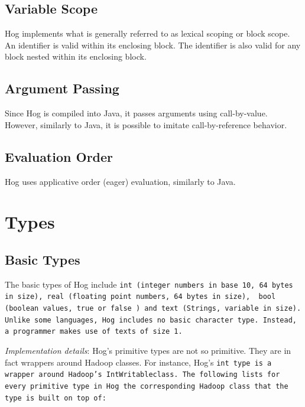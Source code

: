 \documentclass{book}
\begin{document}

\subsection{Variable Scope} %
\label{sub:variable_scope}

Hog implements what is generally referred to as lexical scoping or block scope. An
identifier is valid within its enclosing block. The identifier is also valid for
any block nested within its enclosing block.



\subsection{Argument Passing}
\label{sub:argument_passing}

Since Hog is compiled into Java, it passes arguments using call-by-value.
However, similarly to Java, it is possible to imitate call-by-reference
behavior. 

\subsection{Evaluation Order}
\label{sub:evaluation_order}

Hog uses applicative order (eager) evaluation, similarly to Java.



\section{Types} %
\label{sec:types}

\subsection{Basic Types} %
\label{sub:basic_types}

The basic types of Hog include \tt int \rm (integer numbers in base 10, 64
bytes in size), \tt real \rm (floating point numbers, 64 bytes in size), \tt
bool \rm(boolean values, \tt true \rm or \tt false \rm) and \tt text \rm
(Strings, variable in size).  Unlike some languages, Hog includes no basic
character type. Instead, a programmer makes use of \tt text\rm s of size 1.

\emph{Implementation details}: Hog’s primitive types are not so primitive. They are
in fact wrappers around Hadoop classes. For instance, Hog’s \tt int \rm type is a
wrapper around Hadoop's \tt IntWritableclass\rm. The following lists for every
primitive type in Hog the corresponding Hadoop class that the type is built on top
of:
\end{document}
